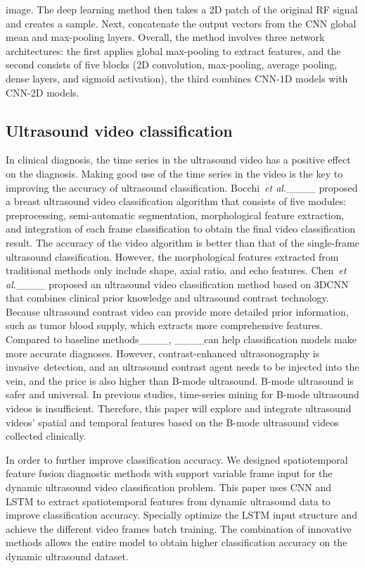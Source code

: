 image. The deep learning method then takes a 2D patch of the original RF signal and creates a sample. Next, concatenate the output vectors from the CNN global mean and max-pooling layers. Overall, the method involves three network architectures: the first applies global max-pooling to extract features, and the second consists of five blocks (2D convolution, max-pooling, average pooling, dense layers, and sigmoid activation), the third combines CNN-1D models with CNN-2D models. 
\subsection{Ultrasound video classification}
In clinical diagnosis, the time series in the ultrasound video has a positive effect on the diagnosis. Making good use of the time series in the video is the key to improving the accuracy of ultrasound classification. Bocchi~\emph{et al}.____ proposed a breast ultrasound video classification algorithm that consists of five modules: preprocessing, semi-automatic segmentation, morphological feature extraction, and integration of each frame classification to obtain the final video classification result. The accuracy of the video algorithm is better than that of the single-frame ultrasound classification. However, the morphological features extracted from traditional methods only include shape, axial ratio, and echo features. Chen~\emph{et al}.____ proposed an ultrasound video classification method based on 3DCNN that combines clinical prior knowledge and ultrasound contrast technology. Because ultrasound contrast video can provide more detailed prior information, such as tumor blood supply, which extracts more comprehensive features. Compared to baseline methods____, ____can help classification models make more accurate diagnoses. However, contrast-enhanced ultrasonography is invasive detection, and an ultrasound contrast agent needs to be injected into the vein, and the price is also higher than B-mode ultrasound. B-mode ultrasound is safer and universal. In previous studies, time-series mining for B-mode ultrasound videos is insufficient. Therefore, this paper will explore and integrate ultrasound videos' spatial and temporal features based on the B-mode ultrasound videos collected clinically.

In order to further improve classification accuracy. We designed spatiotemporal feature fusion diagnostic methods with support variable frame input for the dynamic ultrasound video classification problem. This paper uses CNN and LSTM to extract spatiotemporal features from dynamic ultrasound data to improve classification accuracy. Specially optimize the LSTM input structure and achieve the different video frames batch training. The combination of innovative methods allows the entire model to obtain higher classification accuracy on the dynamic ultrasound dataset.